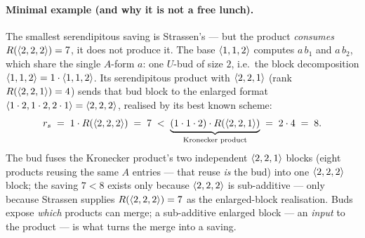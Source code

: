 \paragraph{Minimal example (and why it is not a free lunch).} The smallest serendipitous
saving is Strassen's --- but the product \emph{consumes} \(R(\langle 2, 2, 2 \rangle)=7\), it
does not produce it. The base \(\langle 1, 1, 2 \rangle\) computes \(a\,b_1\) and \(a\,b_2\),
which share the single \(A\)-form \(a\): one \(U\)-bud of size \(2\), i.e.\ the block
decomposition \(\langle 1, 1, 2 \rangle = 1\cdot\langle 1, 1, 2 \rangle\). Its serendipitous product
with \(\langle 2, 2, 1 \rangle\) (rank \(R(\langle 2, 2, 1 \rangle)=4\)) sends that bud block to the
enlarged format \(\langle 1\cdot 2, 1\cdot 2, 2\cdot 1 \rangle = \langle 2, 2, 2 \rangle\), realised
by its best known scheme:
\[
  r_s \;=\; 1\cdot R(\langle 2, 2, 2 \rangle) \;=\; 7
  \;<\;
  \underbrace{(1\cdot 1\cdot 2)\cdot R(\langle 2, 2, 1 \rangle)}_{\text{Kronecker product}}
  \;=\; 2\cdot 4 \;=\; 8 .
\]
The bud fuses the Kronecker product's two independent \(\langle 2, 2, 1 \rangle\) blocks (eight
products reusing the same \(A\) entries --- that reuse \emph{is} the bud) into one
\(\langle 2, 2, 2 \rangle\) block; the saving \(7<8\) exists only because \(\langle 2, 2, 2 \rangle\)
is sub-additive --- only because Strassen supplies \(R(\langle 2, 2, 2 \rangle)=7\) as the
enlarged-block realisation. Buds expose \emph{which} products can merge; a sub-additive
enlarged block --- an \emph{input} to the product --- is what turns the merge into a saving.

